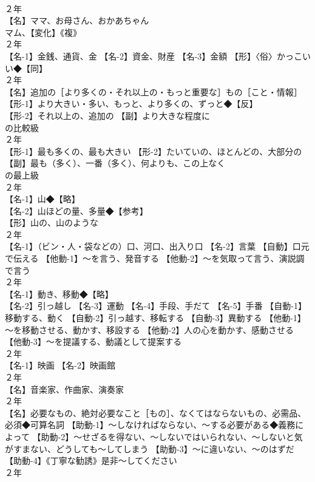 \documentclass[8pt]{extreport}
\begin{document}
\begin{CJK}{UTF8}{min}
\\	２年	
\\	【名】ママ、お母さん、おかあちゃん 
\\	マム、【変化】《複》
\\	２年	
\\	【名-1】金銭、通貨、金 【名-2】資金、財産 【名-3】金額 【形】〈俗〉かっこいい◆【同】
\\	２年	
\\	【名】追加の［より多くの・それ以上の・もっと重要な］もの［こと・情報］ 【形-1】より大きい・多い、もっと、より多くの、ずっと◆【反】
\\	【形-2】それ以上の、追加の 【副】より大きな程度に
\\	の比較級
\\	２年	
\\	【形-1】最も多くの、最も大きい 【形-2】たいていの、ほとんどの、大部分の 【副】最も（多く）、一番（多く）、何よりも、この上なく
\\	の最上級
\\	２年	
\\	【名-1】山◆【略】
\\	【名-2】山ほどの量、多量◆【参考】
\\	【形】山の、山のような
\\	２年	
\\	【名-1】（ビン・人・袋などの）口、河口、出入り口 【名-2】言葉 【自動】口元で伝える 【他動-1】～を言う、発音する 【他動-2】～を気取って言う、演説調で言う
\\	２年	
\\	【名-1】動き、移動◆【略】
\\	【名-2】引っ越し 【名-3】運動 【名-4】手段、手だて 【名-5】手番 【自動-1】移動する、動く 【自動-2】引っ越す、移転する 【自動-3】異動する 【他動-1】～を移動させる、動かす、移設する 【他動-2】人の心を動かす、感動させる 【他動-3】～を提議する、動議として提案する
\\	２年	
\\	【名-1】映画 【名-2】映画館
\\	２年	
\\	【名】音楽家、作曲家、演奏家
\\	２年	
\\	【名】必要なもの、絶対必要なこと［もの］、なくてはならないもの、必需品、必須◆可算名詞 【助動-1】～しなければならない、～する必要がある◆義務によって 【助動-2】～せざるを得ない、～しないではいられない、～しないと気がすまない、どうしても～してしまう 【助動-3】～に違いない、～のはずだ 【助動-4】《丁寧な勧誘》是非～してください
\\	２年	

\end{CJK}
\end{document}
